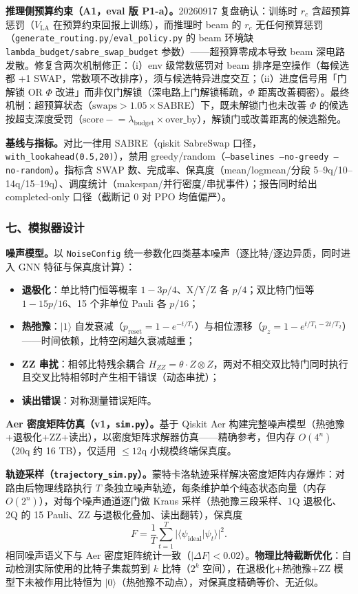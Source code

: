 \textbf{推理侧预算约束（A1，eval 版 P1-a）。}20260917 复盘确认：训练时 $r_c$ 含超预算惩罚（$V_{\mathrm{LA}}$ 在预算约束回报上训练），而推理时 beam 的 $r_c$ 无任何预算惩罚（\texttt{generate\_routing.py}/\texttt{eval\_policy.py} 的 beam 环境缺 \texttt{lambda\_budget/sabre\_swap\_budget} 参数）——超预算零成本导致 beam 深电路发散。修复含两次机制修正：（i）env 级常数惩罚对 beam 排序是空操作（每候选都 +1 SWAP，常数项不改排序），须与候选特异进度交互；（ii）进度信号用「门解锁 OR $\Phi$ 改进」而非仅门解锁（深电路上门解锁稀疏，$\Phi$ 距离改善稠密）。最终机制：超预算状态（$\mathrm{swaps}>1.05\times$SABRE）下，既未解锁门也未改善 $\Phi$ 的候选按超支深度受罚（$\mathrm{score}\mathrel{-}=\lambda_{\mathrm{budget}}\times\mathrm{over\_by}$），解锁门或改善距离的候选豁免。

\textbf{基线与指标。}对比一律用 SABRE（qiskit SabreSwap 口径，\texttt{with\_lookahead(0.5,20)}），禁用 greedy/random（\texttt{--baselines --no-greedy --no-random}）。指标含 SWAP 数、完成率、保真度（mean/logmean/分段 5--9q/10--14q/15--19q）、调度统计（makespan/并行密度/串扰事件）；报告同时给出 completed-only 口径（截断记 0 对 PPO 均值偏严）。

\subsubsection{七、模拟器设计}

\textbf{噪声模型。}以 \texttt{NoiseConfig} 统一参数化四类基本噪声（逐比特/逐边异质，同时进入 GNN 特征与保真度计算）：
\begin{itemize}
    \item \textbf{退极化}：单比特门恒等概率 $1-3p/4$、X/Y/Z 各 $p/4$；双比特门恒等 $1-15p/16$、15 个非单位 Pauli 各 $p/16$；
    \item \textbf{热弛豫}：$|1\rangle$ 自发衰减（$p_{\mathrm{reset}}=1-e^{-t/T_1}$）与相位漂移（$p_z=1-e^{t/T_1-2t/T_2}$）——时间依赖，比特空闲越久衰减越重；
    \item \textbf{ZZ 串扰}：相邻比特残余耦合 $H_{ZZ}=\theta\cdot Z\otimes Z$，两对不相交双比特门同时执行且交叉比特相邻时产生相干错误（动态串扰）；
    \item \textbf{读出错误}：对称测量错误矩阵。
\end{itemize}

\textbf{Aer 密度矩阵仿真（v1，\texttt{sim.py}）。}基于 Qiskit Aer 构建完整噪声模型（热弛豫+退极化+ZZ+读出），以密度矩阵求解器仿真——精确参考，但内存 $O(4^n)$（20q 约 16 TB），仅适用 $\le12$q 小规模终端保真度。

\textbf{轨迹采样（\texttt{trajectory\_sim.py}）。}蒙特卡洛轨迹采样解决密度矩阵内存爆炸：对路由后物理线路执行 $T$ 条独立噪声轨迹，每条维护单个纯态状态向量（内存 $O(2^n)$），对每个噪声通道逐门做 Kraus 采样（热弛豫三段采样、1Q 退极化、2Q 的 15 Pauli、ZZ 与退极化叠加、读出翻转），保真度
\[
F=\frac1T\sum_{t=1}^{T}\big|\langle\psi_{\mathrm{ideal}}|\psi_t\rangle\big|^2.
\]
相同噪声语义下与 Aer 密度矩阵统计一致（$|\Delta F|<0.02$）。\textbf{物理比特截断优化}：自动检测实际使用的比特子集裁剪到 $k$ 比特（$2^k$ 空间），在退极化+热弛豫+ZZ 模型下未被作用比特恒为 $|0\rangle$（热弛豫不动点），对保真度精确等价、无近似。

